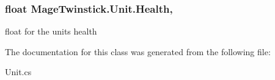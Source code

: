 \subsubsection[{Health}]{\setlength{\rightskip}{0pt plus 5cm}float Mage\+Twinstick.\+Unit.\+Health\hspace{0.3cm}{\ttfamily [get]}, {\ttfamily [set]}}\label{class_mage_twinstick_1_1_unit_af7e080c507d33af04d6d1e8abc665047}


float for the units health 



The documentation for this class was generated from the following file\+:\begin{DoxyCompactItemize}
\item 
Unit.\+cs\end{DoxyCompactItemize}
